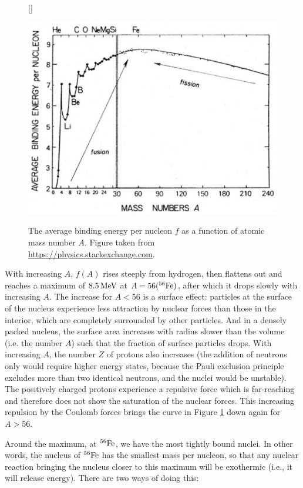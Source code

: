 \documentclass[a4paper,10pt]{article}
\begin{document}
\begin{figure}[t]
    [\FBwidth]
    {\caption{\footnotesize{The average binding energy per nucleon $f$ as a function of atomic mass number $A$. Figure taken from \href{https://physics.stackexchange.com}{https://physics.stackexchange.com}.}}
    \label{fig:nucleonbindingenergy}}
    {\includegraphics[width=12cm]{figures/NucleonBindingEnergy.png}}
\end{figure}

{\noindent}With increasing $A$, $f(A)$ rises steeply from hydrogen, then flattens out and reaches a maximum of $8.5\,{\rm MeV}$ at $A=56(^{56}{\rm Fe})$, after which it drops slowly with increasing $A$. The increase for $A<56$ is a surface effect: particles at the surface of the nucleus experience less attraction by nuclear forces than those in the interior, which are completely surrounded by other particles. And in a densely packed nucleus, the surface area increases with radius slower than the volume (i.e. the number $A$) such that the fraction of surface particles drops. With increasing $A$, the number $Z$ of protons also increases (the addition of neutrons only would require higher energy states, because the Pauli exclusion principle excludes more than two identical neutrons, and the nuclei would be unstable). The positively charged protons experience a repulsive force which is far-reaching and therefore does not show the saturation of the nuclear forces. This increasing repulsion by the Coulomb forces brings the curve in Figure \ref{fig:nucleonbindingenergy} down again for $A>56$.

{\noindent}Around the maximum, at $^{56}{\rm Fe}$, we have the most tightly bound nuclei. In other words, the nucleus of $^{56}{\rm Fe}$ has the smallest mass per nucleon, so that any nuclear reaction bringing the nucleus closer to this maximum will be exothermic (i.e., it will release energy). There are two ways of doing this:
\end{document}
